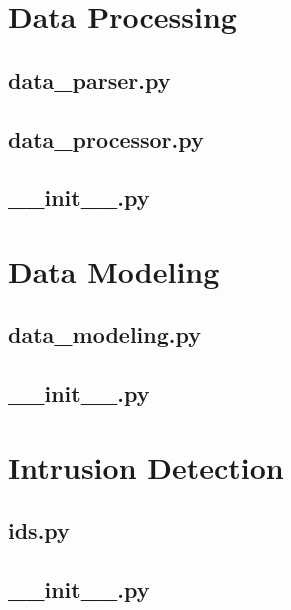 \section{Data Processing}
\subsection{data\_parser.py}

\subsection{data\_processor.py}

\subsection{\_\_init\_\_.py}


\section{Data Modeling}
\subsection{data\_modeling.py}

\subsection{\_\_init\_\_.py}


\section{Intrusion Detection}
\subsection{ids.py}

\subsection{\_\_init\_\_.py}

